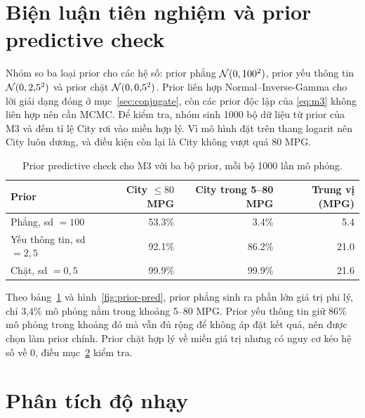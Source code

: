 \documentclass[12pt,a4paper]{report}
\begin{document}
\section{Biện luận tiên nghiệm và prior predictive check}
\label{sec:priors}

Nhóm so ba loại prior cho các hệ số: prior phẳng $\mathcal{N}(0, 100^2)$, prior yếu thông
tin $\mathcal{N}(0, 2{,}5^2)$ và prior chặt $\mathcal{N}(0, 0{,}5^2)$. Prior liên hợp
Normal--Inverse-Gamma cho lời giải dạng đóng ở mục~\ref{sec:conjugate}, còn các
prior độc lập của \eqref{eq:m3} không liên hợp nên cần MCMC. Để kiểm tra, nhóm
sinh \num{1000} bộ dữ liệu từ prior của M3 và đếm tỉ lệ City rơi vào miền hợp
lý. Vì mô hình đặt trên thang logarit nên City luôn dương, và điều kiện còn lại
là City không vượt quá 80 MPG.

\begin{table}[tp]
  \centering
  \caption{Prior predictive check cho M3 với ba bộ prior, mỗi bộ \num{1000} lần
    mô phỏng.}
  \label{tab:prior-pred}
  \begin{tabular}{lrrr}
    \toprule
    Prior & City $\le 80$ MPG & City trong 5--80 MPG & Trung vị (MPG) \\
    \midrule
    Phẳng, sd $= 100$        & \num{53.3}\% & \num{3.4}\%  & \num{5.4} \\
    Yếu thông tin, sd $= 2{,}5$ & \num{92.1}\% & \num{86.2}\% & \num{21.0} \\
    Chặt, sd $= 0{,}5$       & \num{99.9}\% & \num{99.9}\% & \num{21.6} \\
    \bottomrule
  \end{tabular}
\end{table}

Theo bảng~\ref{tab:prior-pred} và hình~\ref{fig:prior-pred}, prior phẳng sinh ra
phần lớn giá trị phi lý, chỉ 3{,}4\% mô phỏng nằm trong khoảng 5--80 MPG. Prior
yếu thông tin giữ 86\% mô phỏng trong khoảng đó mà vẫn đủ rộng để không áp đặt
kết quả, nên được chọn làm prior chính. Prior chặt hợp lý về miền giá trị nhưng
có nguy cơ kéo hệ số về 0, điều mục~\ref{sec:sensitivity} kiểm tra.


\section{Phân tích độ nhạy}
\label{sec:sensitivity}
\end{document}
